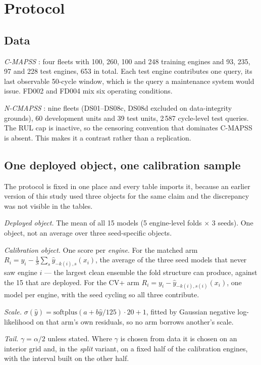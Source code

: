 \documentclass[journal]{IEEEtran}
\begin{document}
\section{Protocol}\label{sec:protocol}

\subsection{Data}

\emph{C-MAPSS} \cite{saxena2008}: four fleets with 100, 260, 100 and 248 training engines and
93, 235, 97 and 228 test engines, 653 in total. Each test engine contributes one query, its
last observable 50-cycle window, which is the query a maintenance system would issue. FD002
and FD004 mix six operating conditions.

\emph{N-CMAPSS} \cite{arias2021}: nine fleets (DS01--DS08c, DS08d excluded on data-integrity
grounds), 60 development units and 39 test units, 2\,587 cycle-level test queries. The RUL cap
is inactive, so the censoring convention that dominates C-MAPSS is absent. This makes it a
contrast rather than a replication.

\subsection{One deployed object, one calibration sample}

The protocol is fixed in one place and every table imports it, because an earlier version of
this study used three objects for the same claim and the discrepancy was not visible in the
tables.

\emph{Deployed object.} The mean of all 15 models (5 engine-level folds $\times$ 3 seeds).
One object, not an average over three seed-specific objects.

\emph{Calibration object.} One score per \emph{engine}. For the matched arm
$R_i=y_i-\frac1S\sum_s\hat y_{-k(i),s}(x_i)$, the average of the three seed models that never
saw engine $i$ --- the largest clean ensemble the fold structure can produce, against the 15
that are deployed. For the CV+ arm $R_i=y_i-\hat y_{-k(i),s(i)}(x_i)$, one model per engine,
with the seed cycling so all three contribute.

\emph{Scale.} $\sigma(\hat y)=\mathrm{softplus}(a+b\hat y/125)\cdot20+1$, fitted by Gaussian
negative log-likelihood on that arm's own residuals, so no arm borrows another's scale.

\emph{Tail.} $\gamma=\alpha/2$ unless stated. Where $\gamma$ is chosen from data it is chosen
on an interior grid and, in the \emph{split} variant, on a fixed half of the calibration
engines, with the interval built on the other half.
\end{document}
